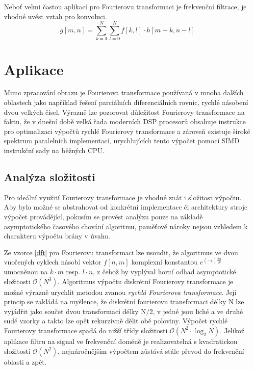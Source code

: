 \documentclass[11pt,a4paper]{article}
\begin{document}
Neboť velmi častou aplikací pro Fourierovu transformaci je frekvenční filtrace, je vhodné uvést vztah 
pro konvoluci.
\begin{equation}
g[m,n] = \sum_{k=0}^{N}{\sum_{l=0}^{N}{f[k,l]\cdot h[m-k, n-l]}}
\label{konvoluce}
\end{equation}


\section{Aplikace}
Mimo zpracování obrazu je Fourierova transformace používaná v mnoha dalších oblastech jako například
řešení parciálních diferenciálních rovnic, rychlé násobení dvou velkých čísel. Výrazně lze pozorovat
důležitost Fourierovy transformace na faktu, že v dnešní době velká řada moderních DSP procesorů obsahuje
instrukce pro optimalizaci výpočtů rychlé Fourierovy transformace a zároveň existuje široké spektrum
paralelních implementací, urychlujících tento výpočet pomocí SIMD instrukční sady na běžných CPU.

\subsection{Analýza složitosti}
Pro ideální využití Fourierovy transformace je vhodné znát i složitost výpočtu. Aby bylo  možné se
abstrahovat od konkrétní implementace či architektury stroje výpočet provádějící, 
pokusím se provést analýzu pouze na základě asymptotického časového chování algoritmu, paměťové
nároky nejsou vzhledem k charakteru výpočtu brány v úvahu.

Ze vzorce \ref{dft} pro Fourierovu transformaci lze usoudit, že algoritmus ve dvou vnořených cyklech
násobí vektor $f[n,m]$ komplexní konstantou $e^{(-i)\frac{2\pi}{N}}$ umocněnou na $k\cdot m$ resp.
$l\cdot n$, z čehož by vyplýval horní odhad asymptotické složitosti $\mathcal{O}(N^3)$. 
Algoritmus výpočtu diskrétní Fourierovy transformace je možné výrazně urychlit metodou zvanou 
\textit{rychlá Fourierova transformace}. Její princip se zakládá na myšlence, že diskrétní fourierovu
transformaci délky N lze vyjádřit jako součet dvou transformací délky N/2, v jedné jsou liché a ve
druhé sudé vzorky a takto lze opět rekurzivně dělit obě poloviny. Výpočet rychlé Fourierovy transformace
spadá do nižší třídy složitosti $\mathcal{O}(N^2 \cdot \log_{2}{N})$. Jelikož aplikace filtru na signal ve
frekvenční doméně je realizovatelná s kvadratickou složitostí $\mathcal{O}(N^2)$, nejnáročnějším výpočtem
zůstává stále převod do frekvenční oblasti a zpět.
\end{document}
